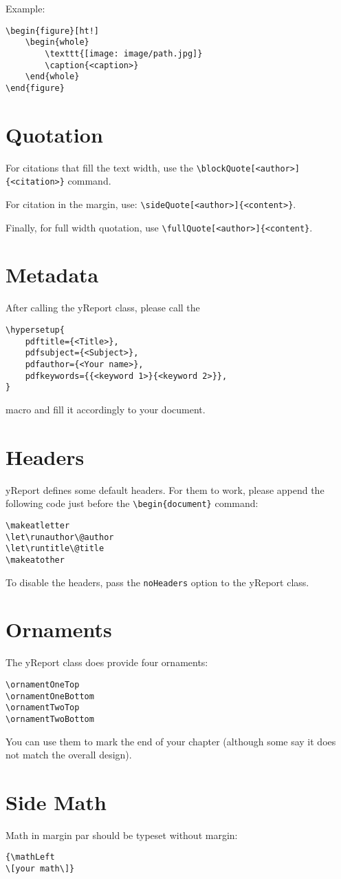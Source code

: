 \documentclass[a4paper, 11pt, oneside, fleqn]{article}
\begin{document}
	Example:
	\begin{lstlisting}
\begin{figure}[ht!]
	\begin{whole}
		\texttt{[image: image/path.jpg]}
		\caption{<caption>}
	\end{whole}
\end{figure}
	\end{lstlisting}

	\section{Quotation}
	For citations that fill the text width, use the \lstinline|\blockQuote[<author>]{<citation>}| command.
	
	For citation in the margin, use: \lstinline|\sideQuote[<author>]{<content>}|.
	
	Finally, for full width quotation, use \lstinline|\fullQuote[<author>]{<content}|.
	
	\section{Metadata}
	After calling the yReport class, please call the
	
	\begin{lstlisting}
\hypersetup{
	pdftitle={<Title>},
	pdfsubject={<Subject>},
	pdfauthor={<Your name>},
	pdfkeywords={{<keyword 1>}{<keyword 2>}},
}
	\end{lstlisting}
	macro and fill it accordingly to your document.
	
	\section{Headers}
	yReport defines some default headers. For them to work, please append the following code just before the \lstinline|\begin{document}| command:
	\begin{lstlisting}
\makeatletter
\let\runauthor\@author
\let\runtitle\@title
\makeatother
	\end{lstlisting}
	To disable the headers, pass the \lstinline|noHeaders| option to the yReport class.
	
	
	\section{Ornaments}
	The yReport class does provide four ornaments:
	
	\begin{lstlisting}
\ornamentOneTop
\ornamentOneBottom
\ornamentTwoTop
\ornamentTwoBottom
	\end{lstlisting}
	
	You can use them to mark the end of your chapter (although some say it does not match the overall design).

	\section{Side Math}	
	Math in margin par should be typeset without margin:
	\begin{lstlisting}
{\mathLeft
\[your math\]}
	\end{lstlisting}
	
\end{document}
